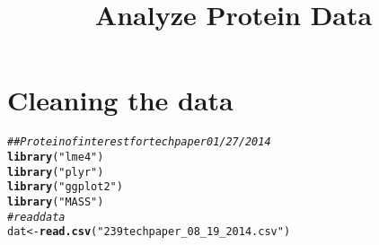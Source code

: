 \documentclass{article}\usepackage[]{graphicx}\usepackage[]{color}
\makeatletter
\newcommand{\hlstr}[1]{\textcolor[rgb]{0.192,0.494,0.8}{#1}}%
\newcommand{\hlcom}[1]{\textcolor[rgb]{0.678,0.584,0.686}{\textit{#1}}}%
\newcommand{\hlstd}[1]{\textcolor[rgb]{0.345,0.345,0.345}{#1}}%
\newcommand{\hlkwb}[1]{\textcolor[rgb]{0.69,0.353,0.396}{#1}}%
\newcommand{\hlkwd}[1]{\textcolor[rgb]{0.737,0.353,0.396}{\textbf{#1}}}%
\newenvironment{kframe}{%
 \def\at@end@of@kframe{}%
 \ifinner\ifhmode%
  \def\at@end@of@kframe{\end{minipage}}%
  \begin{minipage}{\columnwidth}%
 \fi\fi%
 \def\FrameCommand##1{\hskip\@totalleftmargin \hskip-\fboxsep
 \colorbox{shadecolor}{##1}\hskip-\fboxsep
     \hskip-\linewidth \hskip-\@totalleftmargin \hskip\columnwidth}%
 \MakeFramed {\advance\hsize-\width
   \@totalleftmargin\z@ \linewidth\hsize
   \@setminipage}}%
 {\par\unskip\endMakeFramed%
 \at@end@of@kframe}
\newenvironment{knitrout}{}{} %
\makeatother
\begin{document}
\title{Analyze Protein Data}%
\author{} 
\maketitle




\section{Cleaning the data}
\begin{knitrout}
\color{fgcolor}\begin{kframe}
\begin{alltt}
\hlcom{## Protein of interest for tech paper 01/27/2014}
\hlkwd{library}\hlstd{(}\hlstr{"lme4"}\hlstd{)}
\hlkwd{library}\hlstd{(}\hlstr{"plyr"}\hlstd{)}
\hlkwd{library}\hlstd{(}\hlstr{"ggplot2"}\hlstd{)}
\hlkwd{library}\hlstd{(}\hlstr{"MASS"}\hlstd{)}
\hlcom{# read data}
\hlstd{dat} \hlkwb{<-} \hlkwd{read.csv}\hlstd{(}\hlstr{"239 tech paper_08_19_2014.csv"}\hlstd{)}


\end{alltt}
\end{kframe}
\end{knitrout}
\end{document}

